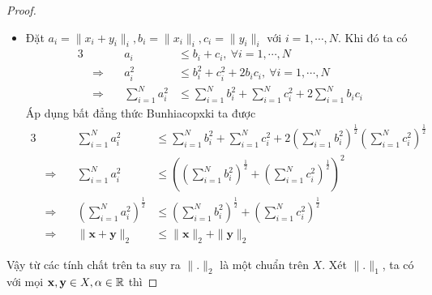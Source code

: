 \begin{proof}
\begin{itemize}
    \item Đặt $a_i = \|x_i+y_i\|_i, b_i = \|x_i\|_i, c_i = \|y_i\|_i$ với $i = 1,\cdots,N$. Khi đó ta có
    \begin{alignat*}{3}
        & & a_i &\leq b_i + c_i,\ \forall i = 1,\cdots,N\\
        &\Rightarrow\quad & a_i^2 &\leq b_i^2 + c_i^2 + 2 b_i c_i,\ \forall i = 1,\cdots,N\\
        &\Rightarrow\quad & \sum_{i=1}^N a_i^2 &\leq \sum_{i=1}^N b_i^2 + \sum_{i=1}^N c_i^2 + 2 \sum_{i=1}^N b_i c_i
    \end{alignat*}
    Áp dụng bất đẳng thức Bunhiacopxki ta được
    \begin{alignat*}{3}
        & & \sum_{i=1}^N a_i^2 &\leq \sum_{i=1}^N b_i^2 + \sum_{i=1}^N c_i^2 + 2 \left(\sum_{i=1}^N b_i^2\right)^{\frac{1}{2}} \left(\sum_{i=1}^N c_i^2\right)^{\frac{1}{2}}\\
        &\Rightarrow\quad & \sum_{i=1}^N a_i^2 &\leq \left(\left(\sum_{i=1}^N b_i^2\right)^{\frac{1}{2}} + \left(\sum_{i=1}^N c_i^2\right)^{\frac{1}{2}}\right)^2\\
        &\Rightarrow\quad & \left(\sum_{i=1}^N a_i^2\right)^{\frac{1}{2}} &\leq \left(\sum_{i=1}^N b_i^2\right)^{\frac{1}{2}} + \left(\sum_{i=1}^N c_i^2\right)^{\frac{1}{2}}\\
        &\Rightarrow\quad & \|\mathbf{x} + \mathbf{y}\|_2 &\leq \|\mathbf{x}\|_2 + \|\mathbf{y}\|_2
    \end{alignat*}
\end{itemize}
Vậy từ các tính chất trên ta suy ra $\|\mathbf{.}\|_2$ là một chuẩn trên $X$.\QEDFill\nll
Xét $\|\mathbf{.}\|_1$, ta có với mọi $\mathbf{x}, \mathbf{y} \in X, \alpha \in \mathbb R$ thì
\end{proof}
